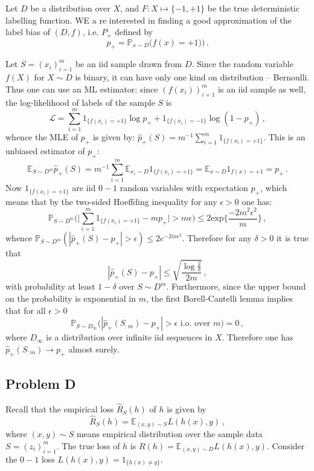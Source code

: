 \documentclass[a4paper]{article}
\newcommand{\ex}{\mathbb{E}}
\newcommand{\pr}{\mathbb{P}}
\begin{document}
Let $D$ be a distribution over $X$, and $F:X\mapsto\{-1,+1\}$ be the true deterministic
labelling function. WE a re interested in finding a good approximation of the label
bias of $(D, f)$, i.e. $P_+$ defined by
\[ p_+ = \pr_{x\sim D}\bigl(f(x) = +1)\bigr) \,. \]

Let $S=(x_i)_{i=1}^m$ be an iid sample drawn from $D$. Since the random variable
$f(X)$ for $X\sim D$ is binary, it can have only one kind on distribution -- Bernoulli.
Thus one can use an ML estimator: since $(f(x_i))_{i=1}^m$ is an iid sample as well,
the log-likelihood of labels of the sample $S$ is
\[ \mathcal{L} = \sum_{i=1}^m 1_{\{f(x_i)=+1\}} \log p_+ + 1_{\{f(x_i)=-1\}} \log(1-p_+) \,, \]
whence the MLE of $p_+$ is given by: $\hat{p}_+(S) = m^{-1} \sum_{i=1}^m 1_{\{f(x_i)=+1\}}$.
This is an unbiased estimator of $p_+$:
\[ \ex_{S\sim D^m} \hat{p}_+(S)
  = m^{-1} \sum_{i=1}^m \ex_{x_i\sim D} 1_{\{f(x_i)=+1\}} 
  = \ex_{x\sim D} 1_{f(x)=+1} = p_+ \,. \]
Now $1_{\{f(x_i)=+1\}}$ are iid $0-1$ random variables with expectation $p_+$, which
means that by the two-sided Hoeffding inequality for any $\epsilon>0$ one has:
\[ \pr_{S\sim D^m}\bigl(
    \bigl| \sum_{i=1}^m 1_{\{f(x_i)=+1\}} - m p_+ \bigr| > m\epsilon
  \bigr) \leq 2 \text{exp}\biggl\{\frac{-2m^2\epsilon^2}{m}\biggr\}
  \,, \]
whence $\pr_{S\sim D^m}( |\hat{p}_+(S) - p_+| > \epsilon ) \leq 2 e^{-2m\epsilon^2}$.
Therefore for any $\delta>0$ it is true that
\[ |\hat{p}_+(S) - p_+| \leq \sqrt{\frac{\log\frac{2}{\delta}}{2m}} \,, \]
with probability at least $1-\delta$ over $S\sim D^m$.
Furthermore, since the upper bound on the probability is exponential in $m$,
the first Borell-Cantelli lemma implies that for all $\epsilon>0$
\[ \pr_{S\sim D_\infty} \bigl(
  |\hat{p}_+(S_{:m}) - p_+| > \epsilon
    \text{ i.o. over } m \bigr) = 0 \,, \]
where $D_\infty$ is a distribution over infinite iid sequences in $X$. Therefore
one has $\hat{p}_+(S_{:m}) \to p_+$ almost surely.


\subsection{Problem D} %
\label{sub:problem_d}
Recall that the empirical loss $\hat{R}_S(h)$ of $h$ is given by
\[ \hat{R}_S(h) = \ex_{(x,y)\sim S} L(h(x), y) \,, \]
where $(x,y)\sim S$ means empirical distribution over the sample data $S=(z_i)_{i=1}^m$.
The true loss of $h$ is $R(h) = \ex_{(x,y)\sim D} L(h(x), y)$. Consider the $0-1$
loss $L(h(x), y) = 1_{\{h(x)\neq y\}}$.
\end{document}

